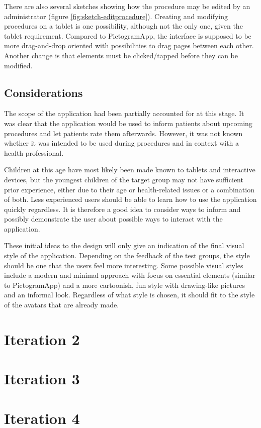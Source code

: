 There are also several sketches showing how the procedure may be edited by an administrator (figure \ref{fig:sketch-editprocedure}). Creating and modifying procedures on a tablet is one possibility, although not the only one, given the tablet requirement. Compared to PictogramApp, the interface is supposed to be more drag-and-drop oriented with possibilities to drag pages between each other. Another change is that elements must be clicked/tapped before they can be modified.

\subsection{Considerations}

The scope of the application had been partially accounted for at this stage. It was clear that the application would be used to inform patients about upcoming procedures and let patients rate them afterwards. However, it was not known whether it was intended to be used during procedures and in context with a health professional.

Children at this age have most likely been made known to tablets and interactive devices, but the youngest children of the target group may not have sufficient prior experience, either due to their age or health-related issues or a combination of both. Less experienced users should be able to learn how to use the application quickly regardless. It is therefore a good idea to consider ways to inform and possibly demonstrate the user about possible ways to interact with the application.

These initial ideas to the design will only give an indication of the final visual style of the application. Depending on the feedback of the test groups, the style should be one that the users feel more interesting. Some possible visual styles include a modern and minimal approach with focus on essential elements (similar to PictogramApp) and a more cartoonish, fun style with drawing-like pictures and an informal look. Regardless of what style is chosen, it should fit to the style of the avatars that are already made.

\section{Iteration 2}

\section{Iteration 3}

\section{Iteration 4}
